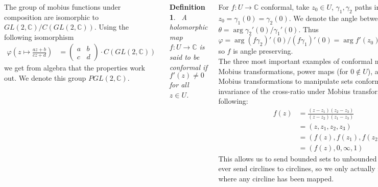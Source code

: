 \documentclass{tikzposter} %
\newtheorem{definition}{Definition}
\begin{document}
\begin{columns}
{  The group of mobius functions under composition are isomorphic to $GL(2, \mathbb{C}) / C(GL(2, \mathbb{C}))$. Using the following isomorphism
  \begin{align*}
    \varphi\left(z \mapsto \frac{az+b}{cz+d}\right) &= \begin{pmatrix}
                                             a & b \\
                                             c & d
                                           \end{pmatrix}
                                                 \cdot C(GL(2,\mathbb{C}))
  \end{align*}
  we get from algebra that the properties work out. We denote this group $PGL(2, \mathbb{C})$. \\

  \begin{definition}
  \ A holomorphic map $f : U \to \mathbb{C}$ is said to be conformal if $f'(z) \neq 0$ for all $z \in U$.
  \end{definition}
  \hphantom{}

  For $f : U \to \mathbb{C}$ conformal, take $z_{0} \in U$, $\gamma_{1}, \gamma_{2}$ paths in $U$ which meet at $z_{0} = \gamma_{1}(0) = \gamma_{2}(0)$. We denote the angle between the paths at this point as $\theta = \arg \gamma_{2}'(0) / \gamma_{1}'(0)$. Thus $\varphi = \arg (f\gamma_{2})'(0) / (f\gamma_{1})'(0) = \arg f'(z_{0})\gamma_{2}'(0) / f'(z_{0}) \gamma_{1}'(0) = \theta$ so $f$ is angle preserving. \\

  The three most important examples of conformal maps for this course are Mobius transformations, power maps (for $0 \notin U$), and exponents. To construct Mobius transformations to manipulate sets conformally as desired, note the invariance of the cross-ratio under Mobius transformations giving us the following:
  \begin{align*}
    f(z) &= \frac{(z-z_{1})(z_{2}-z_{3})}{(z-z_{2})(z_{1}-z_{3})} \\
         &= (z,z_{1},z_{2},z_{3}) \\
         &= (f(z), f(z_{1}), f(z_{2}), f(z_{3})) \\
    &= (f(z), 0, \infty, 1)
  \end{align*}
  This allows us to send bounded sets to unbounded ones. Note that these only ever send circlines to circlines, so we only actually need 3 points to determine to where any circline has been mapped. \\

}
\end{columns}
\end{document}
